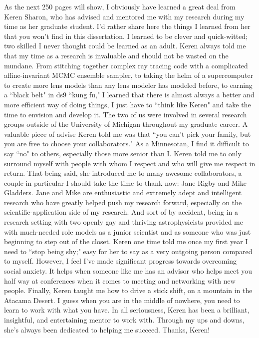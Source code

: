 As the next 250 pages will show, I obviously have learned a great deal from Keren Sharon, who has advised and mentored me with my research during my time as her graduate student. I'd rather share here the things I learned from her that you won't find in this dissertation. I learned to be clever and quick-witted; two skilled I never thought could be learned as an adult. Keren always told me that my time as a research is invaluable and should not be wasted on the mundane. From stitching together complex ray tracing code with a complicated affine-invariant MCMC ensemble sampler, to taking the helm of a supercomputer to create more lens models than any lens modeler has modeled before, to earning a ``black belt" in ds9 ``kung fu," I learned that there is almost always a better and more efficient way of doing things, I just have to ``think like Keren" and take the time to envision and develop it. The two of us were involved in several research groups outside of the University of Michigan throughout my graduate career. A valuable piece of advise Keren told me was that ``you can't pick your family, but you are free to choose your collaborators." As a Minnesotan, I find it difficult to say ``no" to others, especially those more senior than I. Keren told me to only surround myself with people with whom I respect and who will give me respect in return. That being said, she introduced me to many awesome collaborators, a couple in particular I should take the time to thank now: Jane Rigby and Mike Gladders. Jane and Mike are enthusiastic and extremely adept and intelligent research who have greatly helped push my research forward, especially on the scientific-application side of my research. And sort of by accident, being in a research setting with two openly gay and thriving astrophysicists provided me with much-needed role models as a junior scientist and as someone who was just beginning to step out of the closet. Keren one time told me once my first year I need to ``stop being shy;" easy for her to say as a very outgoing person compared to myself. However, I feel I've made significant progress towards overcoming social anxiety. It helps when someone like me has an advisor who helps meet you half way at conferences when it comes to meeting and networking with new people. Finally, Keren taught me how to drive a stick shift, on a mountain in the Atacama Desert. I guess when you are in the middle of nowhere, you need to learn to work with what you have. In all seriousness, Keren has been a brilliant, insightful, and entertaining mentor to work with. Through my ups and downs, she's always been dedicated to helping me succeed. Thanks, Keren!

